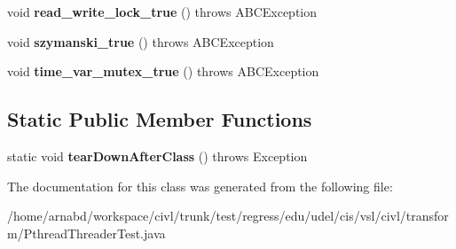 \begin{DoxyCompactItemize}
\item 
\hypertarget{classedu_1_1udel_1_1cis_1_1vsl_1_1civl_1_1transform_1_1PthreadThreaderTest_ada2e1b91b74c5b9cb203f24aad36b9dd}{}void {\bfseries read\+\_\+write\+\_\+lock\+\_\+true} ()  throws A\+B\+C\+Exception \label{classedu_1_1udel_1_1cis_1_1vsl_1_1civl_1_1transform_1_1PthreadThreaderTest_ada2e1b91b74c5b9cb203f24aad36b9dd}

\item 
\hypertarget{classedu_1_1udel_1_1cis_1_1vsl_1_1civl_1_1transform_1_1PthreadThreaderTest_aa9f242ec657ae8474235c4b83e893f82}{}void {\bfseries szymanski\+\_\+true} ()  throws A\+B\+C\+Exception \label{classedu_1_1udel_1_1cis_1_1vsl_1_1civl_1_1transform_1_1PthreadThreaderTest_aa9f242ec657ae8474235c4b83e893f82}

\item 
\hypertarget{classedu_1_1udel_1_1cis_1_1vsl_1_1civl_1_1transform_1_1PthreadThreaderTest_a71da607090ee31cbe1b58790dc599272}{}void {\bfseries time\+\_\+var\+\_\+mutex\+\_\+true} ()  throws A\+B\+C\+Exception \label{classedu_1_1udel_1_1cis_1_1vsl_1_1civl_1_1transform_1_1PthreadThreaderTest_a71da607090ee31cbe1b58790dc599272}

\end{DoxyCompactItemize}
\subsection*{Static Public Member Functions}
\begin{DoxyCompactItemize}
\item 
\hypertarget{classedu_1_1udel_1_1cis_1_1vsl_1_1civl_1_1transform_1_1PthreadThreaderTest_a7a5320bc819ab396efc6672227f2fc91}{}static void {\bfseries tear\+Down\+After\+Class} ()  throws Exception \label{classedu_1_1udel_1_1cis_1_1vsl_1_1civl_1_1transform_1_1PthreadThreaderTest_a7a5320bc819ab396efc6672227f2fc91}

\end{DoxyCompactItemize}


The documentation for this class was generated from the following file\+:\begin{DoxyCompactItemize}
\item 
/home/arnabd/workspace/civl/trunk/test/regress/edu/udel/cis/vsl/civl/transform/Pthread\+Threader\+Test.\+java\end{DoxyCompactItemize}
